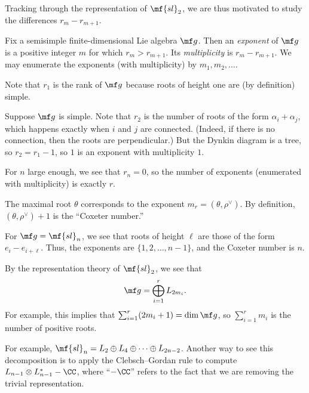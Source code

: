 \documentclass[../notes.tex]{subfiles}
\begin{document}
Tracking through the representation of $\mf{sl}_2$, we are thus motivated to study the differences $r_m-r_{m+1}$.
\begin{definition}[exponent]
	Fix a semisimple finite-dimensional Lie algebra $\mf g$. Then an \textit{exponent} of $\mf g$ is a positive integer $m$ for which $r_m>r_{m+1}$. Its \textit{multiplicity} is $r_m-r_{m+1}$. We may enumerate the exponents (with multiplicity) by $m_1,m_2,\ldots$.
\end{definition}
\begin{example}
	Note that $r_1$ is the rank of $\mf g$ because roots of height one are (by definition) simple.
\end{example}
\begin{example}
	Suppose $\mf g$ is simple. Note that $r_2$ is the number of roots of the form $\alpha_i+\alpha_j$, which happens exactly when $i$ and $j$ are connected. (Indeed, if there is no connection, then the roots are perpendicular.) But the Dynkin diagram is a tree, so $r_2=r_1-1$, so $1$ is an exponent with multiplicity $1$.
\end{example}
\begin{example}
	For $n$ large enough, we see that $r_n=0$, so the number of exponents (enumerated with multiplicity) is exactly $r$.
\end{example}
\begin{example}
	The maximal root $\theta$ corresponds to the exponent $m_r=(\theta,\rho^\lor)$. By definition, $(\theta,\rho^\lor)+1$ is the ``Coxeter number.''
\end{example}
\begin{example}
	For $\mf g=\mf{sl}_n$, we see that roots of height $\ell$ are those of the form $e_i-e_{i+\ell}$. Thus, the exponents are $\{1,2,\ldots,n-1\}$, and the Coxeter number is $n$.
\end{example}
\begin{remark}
	By the representation theory of $\mf{sl}_2$, we see that
	\[\mf g=\bigoplus_{i=1}^rL_{2m_i}.\]
	For example, this implies that $\sum_{i=1}^r(2m_i+1)=\dim\mf g$, so $\sum_{i=1}^rm_i$ is the number of positive roots.
\end{remark}
\begin{example}
	For example, $\mf{sl}_n=L_2\oplus L_4\oplus\cdots\oplus L_{2n-2}$. Another way to see this decomposition is to apply the Clebsch--Gordan rule to compute $L_{n-1}\otimes L_{n-1}^*-\CC$, where ``$-\CC$'' refers to the fact that we are removing the trivial representation.
\end{example}
\end{document}
